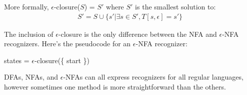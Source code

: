 \documentclass[]{article}
\theoremstyle{definition}
\begin{document}
				More formally, $\epsilon$-closure($S$) = $S'$ where $S'$ is the smallest solution to:
				\begin{align*}
					S' = S \cup \{s' | \exists s \in S', T[s, \epsilon] = s'\}
				\end{align*}

				The inclusion of $\epsilon$-closure is the only difference between the NFA and $\epsilon$-NFA recognizers. Here's the pseudocode for an $\epsilon$-NFA recognizer: \\
				\begin{algorithm}[H]
					states = $\epsilon$-closure(\{ start \})\;
				\end{algorithm}

				DFAs, NFAs, and $\epsilon$-NFAs can all express recognizers for all regular languages, however sometimes one method is more straightforward than the others.
\end{document}
